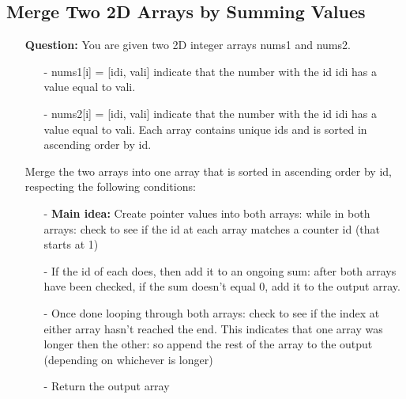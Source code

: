 \documentclass[12pt]{article}
\begin{document}
\subsection{Merge Two 2D Arrays by Summing Values}
\begin{enumerate}
  \item[] \textbf{Question:} You are given two 2D integer arrays nums1 and nums2.

\begin{enumerate}
  \item[-] nums1[i] = [idi, vali] indicate that the number with the id idi has a value equal to vali.
  \item[-] nums2[i] = [idi, vali] indicate that the number with the id idi has a value equal to vali.
Each array contains unique ids and is sorted in ascending order by id.
\end{enumerate}

Merge the two arrays into one array that is sorted in ascending order by id, respecting the following conditions:

    \begin{enumerate}
      \item[-] \textbf{Main idea:} Create pointer values into both arrays: while in both arrays: check to see if the id at each array matches a counter id (that starts at 1)
      \item[-] If the id of each does, then add it to an ongoing sum: after both arrays have been checked, if the sum doesn't equal 0, add it to the output array. 
      \item[-] Once done looping through both arrays: check to see if the index at either array hasn't reached the end. This indicates that one array was longer then the other: so append the rest of the array to the output (depending on whichever is longer)
      \item[-] Return the output array

    \end{enumerate}
\end{enumerate}
\end{document}
